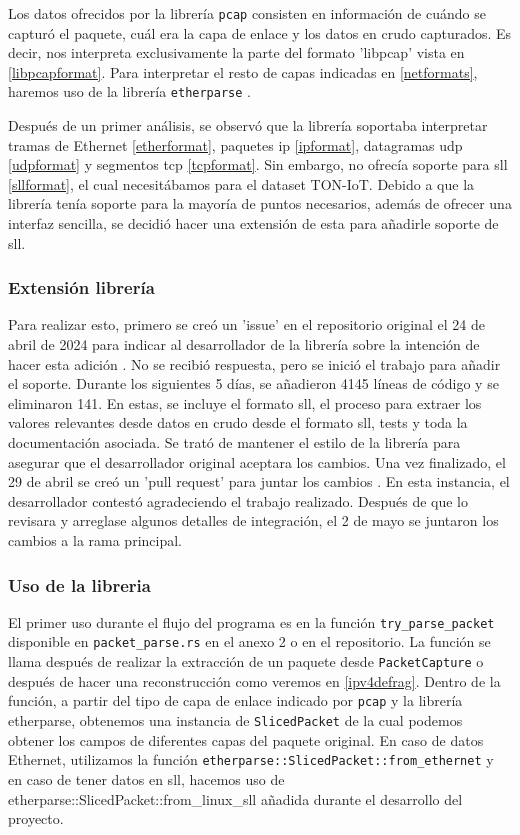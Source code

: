 Los datos ofrecidos por la librería \texttt{pcap} consisten en información de cuándo se capturó el paquete, cuál era la capa de enlace y los datos en crudo capturados. Es decir, nos interpreta exclusivamente la parte del formato 'libpcap' vista en \ref{libpcapformat}. Para interpretar el resto de capas indicadas en \ref{netformats}, haremos uso de la librería \texttt{etherparse} \cite{etherparse}.

Después de un primer análisis, se observó que la librería soportaba interpretar tramas de Ethernet \ref{etherformat}, paquetes \acrshort{ip} \ref{ipformat}, datagramas \acrshort{udp} \ref{udpformat} y segmentos \acrshort{tcp} \ref{tcpformat}. Sin embargo, no ofrecía soporte para \acrshort{sll} \ref{sllformat}, el cual necesitábamos para el dataset TON-IoT. Debido a que la librería tenía soporte para la mayoría de puntos necesarios, además de ofrecer una interfaz sencilla, se decidió hacer una extensión de esta para añadirle soporte de \acrshort{sll}. 

\subsubsection{Extensión librería}

Para realizar esto, primero se creó un 'issue' en el repositorio original el 24 de abril de 2024 para indicar al desarrollador de la librería sobre la intención de hacer esta adición \cite{slladdsllissue}. No se recibió respuesta, pero se inició el trabajo para añadir el soporte. Durante los siguientes 5 días, se añadieron 4145 líneas de código y se eliminaron 141. En estas, se incluye el formato \acrshort{sll}, el proceso para extraer los valores relevantes desde datos en crudo desde el formato \acrshort{sll}, tests y toda la documentación asociada. Se trató de mantener el estilo de la librería para asegurar que el desarrollador original aceptara los cambios. Una vez finalizado, el 29 de abril se creó un 'pull request' para juntar los cambios \cite{slladdsllpr}. En esta instancia, el desarrollador contestó agradeciendo el trabajo realizado. Después de que lo revisara y arreglase algunos detalles de integración, el 2 de mayo se juntaron los cambios a la rama principal.

\subsubsection{Uso de la libreria}

El primer uso durante el flujo del programa es en la función \texttt{try\_parse\_packet} disponible en \texttt{packet\_parse.rs} en el anexo 2 o en el repositorio. La función se llama después de realizar la extracción de un paquete desde \texttt{PacketCapture} o después de hacer una reconstrucción como veremos en \ref{ipv4defrag}. Dentro de la función, a partir del tipo de capa de enlace indicado por \texttt{pcap} y la librería etherparse, obtenemos una instancia de \texttt{SlicedPacket} de la cual podemos obtener los campos de diferentes capas del paquete original. En caso de datos Ethernet, utilizamos la función \texttt{etherparse::SlicedPacket::from\_ethernet} y en caso de tener datos en \acrshort{sll}, hacemos uso de {etherparse::SlicedPacket::from\_linux\_sll} añadida durante el desarrollo del proyecto.

